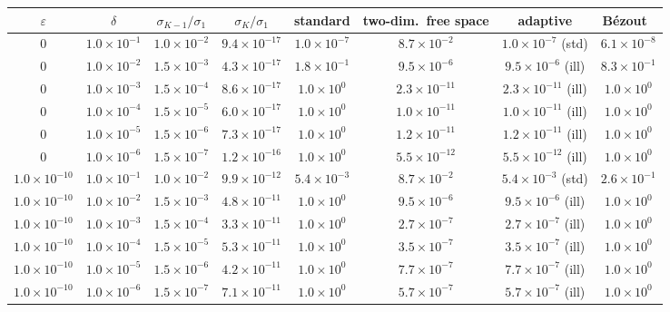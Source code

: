 \begin{tabular}{cccccccc}\hline
$\varepsilon$ & $\delta$ & $\sigma_{K-1}/\sigma_1$ & $\sigma_K/\sigma_1$ & standard & two-dim.\ free space & adaptive & B\'ezout~\cite{sanuki09}\\ \hline
$0$ & $1.0\times 10^{-1}$ & $1.0\times 10^{-2}$ & $9.4\times 10^{-17}$ & $1.0\times 10^{-7}$ & $8.7\times 10^{-2}$ & $1.0\times 10^{-7}$ (std) & $6.1\times 10^{-8}$\\
$0$ & $1.0\times 10^{-2}$ & $1.5\times 10^{-3}$ & $4.3\times 10^{-17}$ & $1.8\times 10^{-1}$ & $9.5\times 10^{-6}$ & $9.5\times 10^{-6}$ (ill) & $8.3\times 10^{-1}$\\
$0$ & $1.0\times 10^{-3}$ & $1.5\times 10^{-4}$ & $8.6\times 10^{-17}$ & $1.0\times 10^{0}$ & $2.3\times 10^{-11}$ & $2.3\times 10^{-11}$ (ill) & $1.0\times 10^{0}$\\
$0$ & $1.0\times 10^{-4}$ & $1.5\times 10^{-5}$ & $6.0\times 10^{-17}$ & $1.0\times 10^{0}$ & $1.0\times 10^{-11}$ & $1.0\times 10^{-11}$ (ill) & $1.0\times 10^{0}$\\
$0$ & $1.0\times 10^{-5}$ & $1.5\times 10^{-6}$ & $7.3\times 10^{-17}$ & $1.0\times 10^{0}$ & $1.2\times 10^{-11}$ & $1.2\times 10^{-11}$ (ill) & $1.0\times 10^{0}$\\
$0$ & $1.0\times 10^{-6}$ & $1.5\times 10^{-7}$ & $1.2\times 10^{-16}$ & $1.0\times 10^{0}$ & $5.5\times 10^{-12}$ & $5.5\times 10^{-12}$ (ill) & $1.0\times 10^{0}$\\
\hline
$1.0\times 10^{-10}$ & $1.0\times 10^{-1}$ & $1.0\times 10^{-2}$ & $9.9\times 10^{-12}$ & $5.4\times 10^{-3}$ & $8.7\times 10^{-2}$ & $5.4\times 10^{-3}$ (std) & $2.6\times 10^{-1}$\\
$1.0\times 10^{-10}$ & $1.0\times 10^{-2}$ & $1.5\times 10^{-3}$ & $4.8\times 10^{-11}$ & $1.0\times 10^{0}$ & $9.5\times 10^{-6}$ & $9.5\times 10^{-6}$ (ill) & $1.0\times 10^{0}$\\
$1.0\times 10^{-10}$ & $1.0\times 10^{-3}$ & $1.5\times 10^{-4}$ & $3.3\times 10^{-11}$ & $1.0\times 10^{0}$ & $2.7\times 10^{-7}$ & $2.7\times 10^{-7}$ (ill) & $1.0\times 10^{0}$\\
$1.0\times 10^{-10}$ & $1.0\times 10^{-4}$ & $1.5\times 10^{-5}$ & $5.3\times 10^{-11}$ & $1.0\times 10^{0}$ & $3.5\times 10^{-7}$ & $3.5\times 10^{-7}$ (ill) & $1.0\times 10^{0}$\\
$1.0\times 10^{-10}$ & $1.0\times 10^{-5}$ & $1.5\times 10^{-6}$ & $4.2\times 10^{-11}$ & $1.0\times 10^{0}$ & $7.7\times 10^{-7}$ & $7.7\times 10^{-7}$ (ill) & $1.0\times 10^{0}$\\
$1.0\times 10^{-10}$ & $1.0\times 10^{-6}$ & $1.5\times 10^{-7}$ & $7.1\times 10^{-11}$ & $1.0\times 10^{0}$ & $5.7\times 10^{-7}$ & $5.7\times 10^{-7}$ (ill) & $1.0\times 10^{0}$\\
\hline
\end{tabular}\\[2pt]
